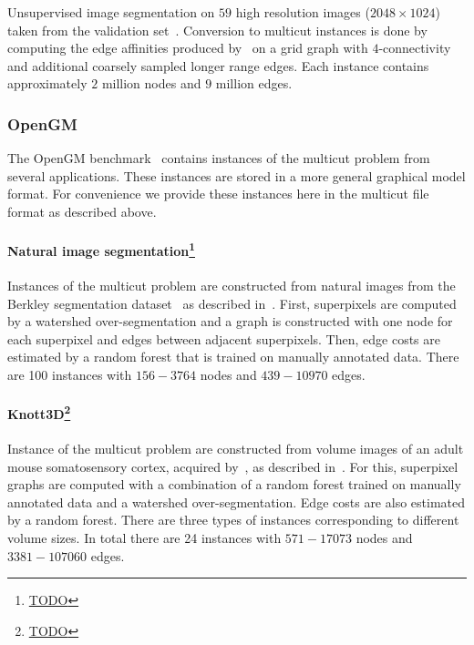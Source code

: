 Unsupervised image segmentation on $59$ high resolution images ($2048 \times 1024$) taken from the validation set~\cite{cordts2016cityscapes}.
Conversion to multicut instances is done by computing the edge affinities produced by~\cite{abbas2021combinatorial} on a grid graph with $4$-connectivity and additional coarsely sampled longer range edges.
Each instance contains approximately $2$ million nodes and $9$ million edges. 

\subsubsection{OpenGM}
The OpenGM benchmark~\cite{kappes2015comparative} contains instances of the multicut problem from several applications.
These instances are stored in a more general graphical model format. 
For convenience we provide these instances here in the multicut file format as described above.

\paragraph{Natural image segmentation\footnote{\url{TODO}}}
Instances of the multicut problem are constructed from natural images from the Berkley segmentation dataset~\cite{MartinFTM01} as described in~\cite{andres2011closedness}. 
First, superpixels are computed by a watershed over-segmentation and a graph is constructed with one node for each superpixel and edges between adjacent superpixels.
Then, edge costs are estimated by a random forest that is trained on manually annotated data.
There are 100 instances with $156-3764$ nodes and  $439-10970$ edges.

\paragraph*{Knott3D\footnote{\url{TODO}}}
Instance of the multicut problem are constructed from volume images of an adult mouse somatosensory cortex, acquired by~\cite{knott2008serial}, as described in~\cite{andres2012globally}.
For this, superpixel graphs are computed with a combination of a random forest trained on manually annotated data and a watershed over-segmentation.
Edge costs are also estimated by a random forest.
There are three types of instances corresponding to different volume sizes.
In total there are 24 instances with $571-17073$ nodes and $3381-107060$ edges.

